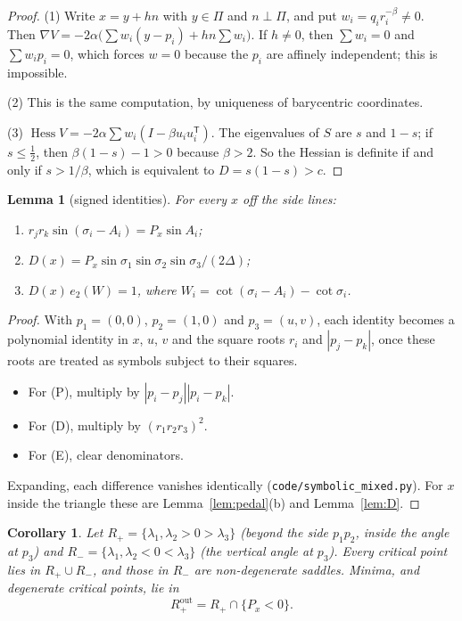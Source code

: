 \documentclass[11pt]{amsart}
\newtheorem{lemma}[theorem]{Lemma}
\newtheorem{corollary}[theorem]{Corollary}
\theoremstyle{remark}
\DeclareMathOperator{\Hess}{Hess}
\begin{document}
\begin{proof}
(1) Write $x=y+hn$ with $y\in\Pi$ and $n\perp\Pi$, and put $w_i=q_ir_i^{-\beta}\ne0$. Then
$\nabla V=-2\alpha\bigl(\sum w_i(y-p_i)+hn\sum w_i\bigr)$. If $h\ne0$, then $\sum w_i=0$ and $\sum w_ip_i=0$, which forces
$w=0$ because the $p_i$ are affinely independent; this is impossible.

(2) This is the same computation, by uniqueness of barycentric coordinates.

(3) $\Hess V=-2\alpha\sum w_i(I-\beta u_iu_i^{\mathsf T})$. The eigenvalues of $S$ are $s$ and $1-s$; if $s\le\tfrac12$,
then $\beta(1-s)-1>0$ because $\beta>2$. So the Hessian is definite if and only if $s>1/\beta$, which is equivalent to
$D=s(1-s)>c$.
\end{proof}

\begin{lemma}[signed identities]\label{lem:signed}
For every $x$ off the side lines:
\begin{enumerate}
\item[(P)] $r_jr_k\sin(\sigma_i-A_i)=P_x\sin A_i$;
\item[(D)] $D(x)=P_x\sin\sigma_1\sin\sigma_2\sin\sigma_3/(2\Delta)$;
\item[(E)] $D(x)\,e_2(W)=1$, where $W_i=\cot(\sigma_i-A_i)-\cot\sigma_i$.
\end{enumerate}
\end{lemma}

\begin{proof}
With $p_1=(0,0)$, $p_2=(1,0)$ and $p_3=(u,v)$, each identity becomes a polynomial identity in $x$, $u$, $v$ and the
square roots $r_i$ and $|p_j-p_k|$, once these roots are treated as symbols subject to their squares.
\begin{itemize}
\item For (P), multiply by $|p_i-p_j||p_i-p_k|$.
\item For (D), multiply by $(r_1r_2r_3)^2$.
\item For (E), clear denominators.
\end{itemize}
Expanding, each difference vanishes identically (\texttt{code/symbolic\_mixed.py}). For $x$ inside the triangle these
are Lemma~\ref{lem:pedal}(b) and Lemma~\ref{lem:D}.
\end{proof}

\begin{corollary}\label{cor:where}
Let $R_+=\{\lambda_1,\lambda_2>0>\lambda_3\}$ (beyond the side $p_1p_2$, inside the angle at $p_3$) and
$R_-=\{\lambda_1,\lambda_2<0<\lambda_3\}$ (the vertical angle at $p_3$). Every critical point lies in
$R_+\cup R_-$, and those in $R_-$ are non-degenerate saddles. Minima, and degenerate critical points, lie in
\[
  R_+^{\mathrm{out}}=R_+\cap\{P_x<0\}.
\]
\end{corollary}
\end{document}
